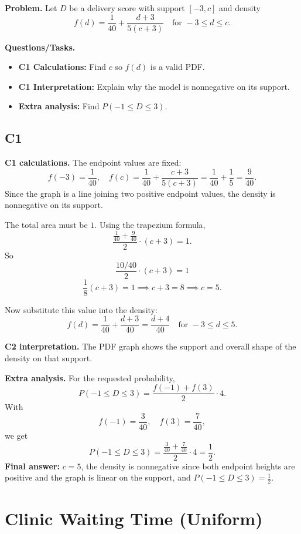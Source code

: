 	\textbf{Problem.}
	Let $D$ be a delivery score with support $[-3,c]$ and density
	\[
	f(d)=\frac{1}{40}+\frac{d+3}{5(c+3)}\quad\text{for }-3\le d\le c.
	\]
	
	\textbf{Questions/Tasks.}
	\begin{itemize}
		\item \textbf{C1 Calculations:} Find $c$ so $f(d)$ is a valid PDF.
		\item \textbf{C1 Interpretation:} Explain why the model is nonnegative on its support.
		\item \textbf{Extra analysis:} Find $P(-1\le D\le 3)$.
	\end{itemize}
	
	\subsection*{C1}
	
	\textbf{C1 calculations.}
	The endpoint values are fixed:
	\[
	f(-3)=\frac{1}{40},\quad f(c)=\frac{1}{40}+\frac{c+3}{5(c+3)}=\frac{1}{40}+\frac15=\frac{9}{40}.
	\]
	Since the graph is a line joining two positive endpoint values, the density is nonnegative on its support.
	
	The total area must be $1$. Using the trapezium formula,
	\[
	\frac{\frac{1}{40}+\frac{9}{40}}{2}\cdot(c+3)=1.
	\]
	So
	\[
	\frac{10/40}{2}\cdot(c+3)=1
	\]
	\[
	\frac{1}{8}(c+3)=1\implies c+3=8\implies c=5.
	\]
	
	Now substitute this value into the density:
	\[
	f(d)=\frac{1}{40}+\frac{d+3}{40}=\frac{d+4}{40}\quad\text{for }-3\le d\le 5.
	\]
	
	\textbf{C2 interpretation.}
	The PDF graph shows the support and overall shape of the density on that support.
	
	\textbf{Extra analysis.}
	For the requested probability,
	\[
	P(-1\le D\le3)=\frac{f(-1)+f(3)}{2}\cdot4.
	\]
	With
	\[
	f(-1)=\frac{3}{40},\quad f(3)=\frac{7}{40},
	\]
	we get
	\[
	P(-1\le D\le3)=\frac{\frac{3}{40}+\frac{7}{40}}{2}\cdot4=\frac12.
	\]
	\textbf{Final answer:} $c=5$, the density is nonnegative since both endpoint heights are positive and the graph is linear on the support, and $P(-1\le D\le3)=\frac12$.
	
	\section{Clinic Waiting Time (Uniform)}
	
